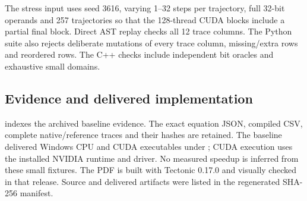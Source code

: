 The stress input uses seed 3616, varying 1--32 steps per trajectory, full 32-bit
operands and 257 trajectories so that the 128-thread CUDA blocks include a partial
final block. Direct AST replay checks all 12 trace columns. The Python suite also
rejects deliberate mutations of every trace column, missing/extra rows and reordered
rows. The C++ checks include independent bit oracles and exhaustive small domains.

\subsection{Evidence and delivered implementation}
 indexes the archived baseline evidence. The exact equation
JSON, compiled CSV, complete native/reference traces and their hashes are retained.
The baseline delivered Windows CPU and CUDA executables under ; CUDA
execution uses the installed NVIDIA runtime and driver. No measured speedup is
inferred from these small fixtures. The PDF is built with Tectonic 0.17.0 and
visually checked in that release. Source and delivered artifacts were listed in
the regenerated SHA-256 manifest.
\clearpage
